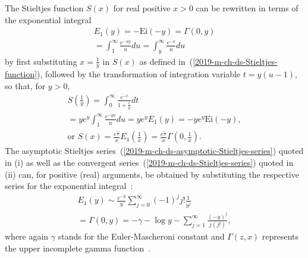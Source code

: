 \documentclass[%
  twocolumn,
 showpacs,
 showkeys,
 preprintnumbers,
 amsmath,amssymb,
 aps,
  pra,
  longbibliography,
 ]{revtex4-1}
\begin{document}
The Stieltjes function $S(x)$ for real positive $x>0$ can be rewritten in terms of
the exponential integral~\cite[formul\ae~5.1.1, 5.1.2, 5.1.4, page~227]{abramowitz:1964:hmf}
\begin{equation}
\begin{split}
E_1(y) =   -\text{Ei}(-y)
= \Gamma \left( 0, y \right)     \\
=
\int_{1}^\infty    \frac{e^{-uy}}{u} du
=
\int_{y}^\infty    \frac{e^{-u}}{u} du
\end{split}
\label{2019-m-ch-ds-Stieltjes-Ei}
\end{equation}
by first substituting $x=\frac{1}{y}$ in $S(x)$ as defined in~(\ref{2019-m-ch-ds-Stieltjes-function}), followed by the transformation of integration variable
$t = y(u-1)$, so that, for $y>0$,
\begin{equation}
\begin{split}
S\left(\frac{1}{y}\right)
=  \int_0^\infty    \frac{e^{-t}}{1+\frac{t}{y}} dt\\
=ye^{y}\int_1^\infty    \frac{e^{-yu}}{u}  du
=  ye^{y}E_1(y)  =  -ye^{y}\text{Ei}(-y),  \\
\text{or }
S(x)=  \frac{e^\frac{1}{x}}{x} E_1\left(\frac{1}{x}\right)
= \frac{e^\frac{1}{x}}{x} \Gamma \left( 0, \frac{1}{x} \right)
.
\end{split}
\label{2019-m-ch-ds-Stieltjes-function-Ei}
\end{equation}
The asymptotic Stieltjes
series~(\ref{2019-m-ch-ds-asymptotic-Stieltjes-series})
quoted in (i)
as well as the convergent
series~(\ref{2019-m-ch-ds-Stieltjes-series})
quoted in (ii)
can, for positive (real) arguments, be obtained by substituting the respective series for the
exponential integral~\cite[formul\ae~5.1.51, page~231 and~5.1.10,5.1.11, page~229]{abramowitz:1964:hmf}:
\begin{equation}
\begin{split}
E_1(y)
\sim
\frac{e^{-y}}{y}\sum_{j=0}^\infty (-1)^j j!  \frac{1}{y^j} \\
 = \Gamma \left( 0, y \right)=- \gamma - \log y - \sum_{j=1}^\infty \frac{ (-y)^j }{j (j!)}
,
\end{split}
\label{2019-m-ch-ds-Stieltjes-Ei-se}
\end{equation}
where again $\gamma$ stands for the Euler-Mascheroni constant
and $\Gamma (z,x)$ represents the upper incomplete gamma function~\cite[6.5.1, p~260]{abramowitz:1964:hmf}.
\end{document}
